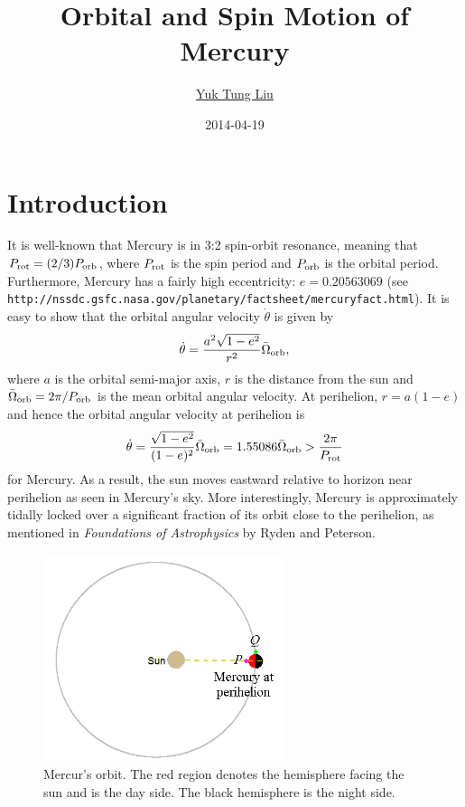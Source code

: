 \documentclass[12pt]{article}
\newcommand \beq {\begin{equation}}
\newcommand \eeq {\end{equation}}
\newcommand{\prot}{P_{\rm rot}}
\newcommand{\porb}{P_{\rm orb}}
\begin{document}
\title{Orbital and Spin Motion of Mercury}
\author{\href{https://publish.illinois.edu/ytliu/}{Yuk Tung Liu}}
\date{2014-04-19}
\maketitle

\section{Introduction}

It is well-known that Mercury is in 3:2 spin-orbit resonance, meaning that
$\prot = (2/3) \porb$, where $\prot$ is the spin period and $\porb$ is the orbital period.
Furthermore, Mercury has a fairly high eccentricity: $e=0.20563069$ (see 
{\tt http://nssdc.gsfc.nasa.gov/planetary/factsheet/mercuryfact.html}). It is 
easy to show that the orbital angular velocity $\dot{\theta}$ is given by 
\[
  \dot{\theta} = \frac{a^2 \sqrt{1-e^2}}{r^2} \bar{\Omega}_{\rm orb} ,
\]
where $a$ is the orbital semi-major axis, $r$ is the distance from the sun 
and $\bar{\Omega}_{\rm orb}=2\pi/\porb$ is the mean orbital angular velocity. At perihelion, 
$r=a(1-e)$ and hence the orbital angular velocity at perihelion is 
\beq
  \dot{\theta} = \frac{\sqrt{1-e^2}}{(1-e)^2} \bar{\Omega}_{\rm orb} 
= 1.55086 \bar{\Omega}_{\rm orb} > \frac{2\pi}{\prot}
\eeq
for Mercury. As a result, the sun moves eastward relative to horizon near perihelion 
as seen in Mercury's sky. More interestingly, Mercury is approximately tidally locked 
over a significant fraction of its orbit close to the perihelion, as mentioned 
in {\it Foundations of Astrophysics} by Ryden and Peterson. 

\begin{figure}
\vskip -5mm
\includegraphics[width=7cm]{MercuryOrbit.png}
\caption{Mercur's orbit. The red region denotes the hemisphere facing the sun and 
is the day side. The black hemisphere is the night side.}
\label{fig:orbit}
\end{figure}
\end{document}
